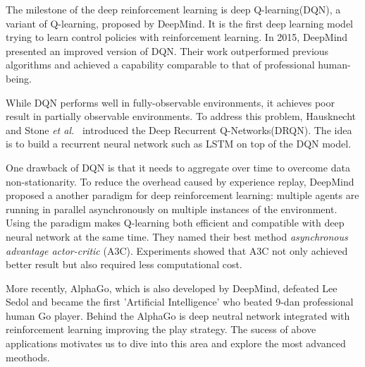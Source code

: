 
The milestone of the deep reinforcement learning is deep Q-learning(DQN)\cite{mnih2013playing}, a variant of Q-learning, proposed by DeepMind. It is the first deep learning model trying to learn control policies with reinforcement learning. In 2015, DeepMind presented an improved version of DQN\cite{mnih2015human}. Their work outperformed previous algorithms and achieved a capability comparable to that of professional human-being.

While DQN performs well in fully-observable environments, it achieves poor result in partially observable environments. To address this problem, Hausknecht and Stone \textit{et al.}~\cite{hausknecht2015deep} introduced the Deep Recurrent Q-Networks(DRQN). The idea is to build a recurrent neural network such as LSTM on top of the DQN model.

%
One drawback of DQN is that it needs to aggregate over time to overcome data non-stationarity. To reduce the overhead caused by experience replay, DeepMind \cite{mnih2016asynchronous} proposed a another paradigm for deep reinforcement learning: multiple agents are running in parallel asynchronously on multiple instances of the environment. Using the paradigm makes Q-learning both efficient and compatible with deep neural network at the same time. They named their best method \textit{asynchronous advantage actor-critic} (A3C). Experiments showed that A3C not only achieved better result but also required less computational cost.

More recently, AlphaGo\cite{brockman2016openai}, which is also developed by DeepMind, defeated Lee Sedol and became the first 'Artificial Intelligence' who beated 9-dan professional human Go player. Behind the AlphaGo is deep neutral network integrated with reinforcement learning improving the play strategy. The sucess of above applications motivates us to dive into this area and
explore the most advanced meothods. 


